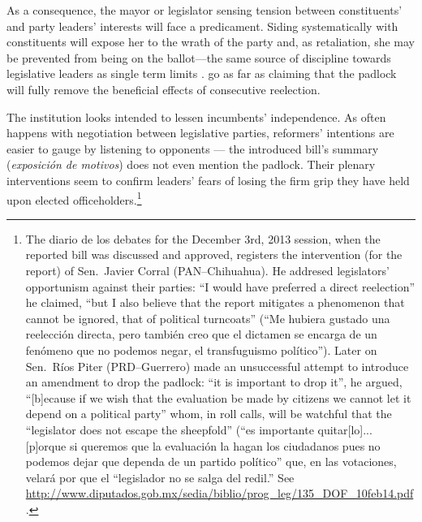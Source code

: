 \documentclass[letter,12pt]{article}
\begin{document}
As a consequence, the mayor or legislator sensing tension between constituents' and party leaders' interests will face a predicament. Siding systematically with constituents will expose her to the wrath of the party and, as retaliation, she may be prevented from being on the ballot---the same source of discipline towards legislative leaders as single term limits \citep{weldon.1997}. \citet{merinoFierroZarkin2013Blog} go as far as claiming that the padlock will fully remove the beneficial effects of consecutive reelection. 

The institution looks intended to lessen incumbents' independence. As often happens with negotiation between legislative parties, reformers' intentions are easier to gauge by listening to opponents --- the introduced bill's summary (\emph{exposición de motivos}) does not even mention the padlock. Their plenary interventions seem to confirm leaders' fears of losing the firm grip they have held upon elected officeholders.\footnote{The diario de los debates for the December 3rd, 2013 session, when the reported bill was discussed and approved, registers the intervention (for the report) of Sen.\ Javier Corral (PAN--Chihuahua). He addresed legislators' opportunism against their parties: ``I would have preferred a direct reelection'' he claimed, ``but I also believe that the report mitigates a phenomenon that cannot be ignored, that of political turncoats'' (``Me hubiera gustado una reelección directa, pero también creo que el dictamen se encarga de un fenómeno que no podemos negar, el transfuguismo político''). Later on Sen.\ Ríos Piter (PRD--Guerrero) made an unsuccessful attempt to introduce an amendment to drop the padlock: ``it is important to drop it'', he argued, ``[b]ecause if we wish that the evaluation be made by citizens we cannot let it depend on a political party'' whom, in roll calls, will be watchful that the ``legislator does not escape the sheepfold'' (``es importante quitar[lo]... [p]orque si queremos que la evaluación la hagan los ciudadanos pues no podemos dejar que dependa de un partido político'' que, en las votaciones, velará por que el ``legislador no se salga del redil.'' See \url{http://www.diputados.gob.mx/sedia/biblio/prog_leg/135_DOF_10feb14.pdf}.}

\end{document}
